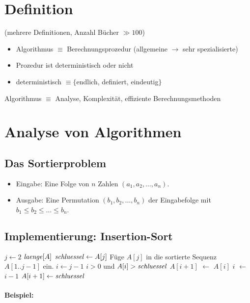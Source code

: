 \documentclass[a4paper]{scrartcl}
\begin{document}

\section{Definition}
(mehrere Definitionen, Anzahl Bücher $\gg 100$)
\begin{itemize}
\item Algorithmus $\equiv$ Berechnungsprozedur
(allgemeine $\rightarrow$ sehr spezialisierte)
\item Prozedur ist deterministisch oder nicht
\item deterministisch $\equiv \{$endlich, definiert, eindeutig$\}$ 
\end{itemize}
Algorithmus $\equiv$ Analyse, Komplexität, effiziente Berechnungsmethoden

\section{Analyse von Algorithmen}

\subsection{Das Sortierproblem}
\begin{itemize}
\item Eingabe: Eine Folge von $n$ Zahlen $(a_1, a_2, \dots, a_n)$.
\item Ausgabe: Eine Permutation $(b_1, b_2, \dots, b_n)$ der Eingabefolge mit
$b_1 \leqslant b_2 \leqslant \dots \leqslant b_n$.
\end{itemize}

\subsection{Implementierung: Insertion-Sort}
\begin{codebox}
\li    \For $j \gets 2$ \To $\id{laenge} [A]$
\li        \Do 
               $\id{schluessel} \gets A[j]$
\li            \Comment Füge $A[j]$ in die sortierte Sequenz $A[1..j-1]$ ein.
\li            $i \gets j-1$
\li            \While $i>0$ und $A[i] > \id{schluessel}$
\li                \Do
                   $A[i+1]$ $\gets$ $A[i]$
\li						     $i$ $\gets$ $i-1$
					         \End
\li			       $A[i+1] \gets \id{schluessel}$
			     \End
\end{codebox}

\paragraph{Beispiel:}\hspace{0.1mm}
\end{document}
